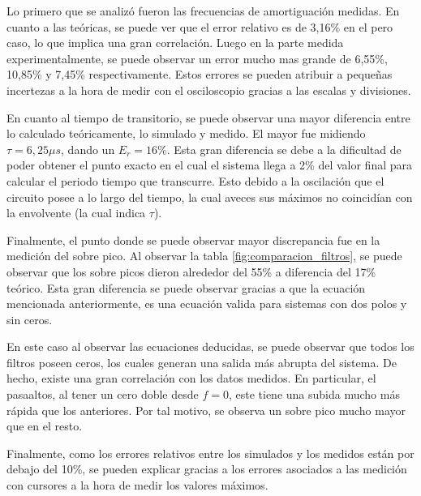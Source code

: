 Lo primero que se analizó fueron las frecuencias de amortiguación medidas. En cuanto a las teóricas, se puede ver que el error relativo es de 3,16\% en el pero caso, lo que implica una gran correlación. Luego en la parte medida experimentalmente, se puede observar un error mucho mas grande de 6,55\%, 10,85\% y 7,45\% respectivamente. Estos errores se pueden atribuir a pequeñas incertezas a la hora de medir con el osciloscopio gracias a las escalas y divisiones. \par

En cuanto al tiempo de transitorio, se puede observar una mayor diferencia entre lo calculado teóricamente, lo simulado y medido. El mayor fue midiendo $\tau = 6,25 \mu s$, dando un $E_r = 16 \%$. Esta gran diferencia se debe a la dificultad de poder obtener el punto exacto en el cual el sistema llega a 2\% del valor final para calcular el periodo tiempo que transcurre. Esto debido a la oscilación que el circuito posee a lo largo del tiempo, la cual aveces sus máximos no coincidían con la envolvente (la cual indica $\tau$).

Finalmente, el punto donde se puede observar mayor discrepancia fue en la medición del sobre pico. Al observar la tabla \ref{fig:comparacion_filtros}, se puede observar que los sobre picos dieron alrededor del 55\% a diferencia del 17\% teórico. Esta gran diferencia se puede observar gracias a que la ecuación mencionada anteriormente, es una ecuación valida para sistemas con dos polos y sin ceros.\par

En este caso al observar las ecuaciones deducidas, se puede observar que todos los filtros poseen ceros, los cuales generan una salida más abrupta del sistema. De hecho, existe una gran correlación con los datos medidos. En particular, el pasaaltos, al tener un cero doble desde $f = 0$, este tiene una subida mucho más rápida que los anteriores. Por  tal motivo, se observa un sobre pico mucho mayor que en el resto. \par

Finalmente, como los errores relativos entre los simulados y los medidos están por debajo del 10\%, se pueden explicar gracias a los errores asociados a las medición con cursores a la hora de medir los valores máximos.
